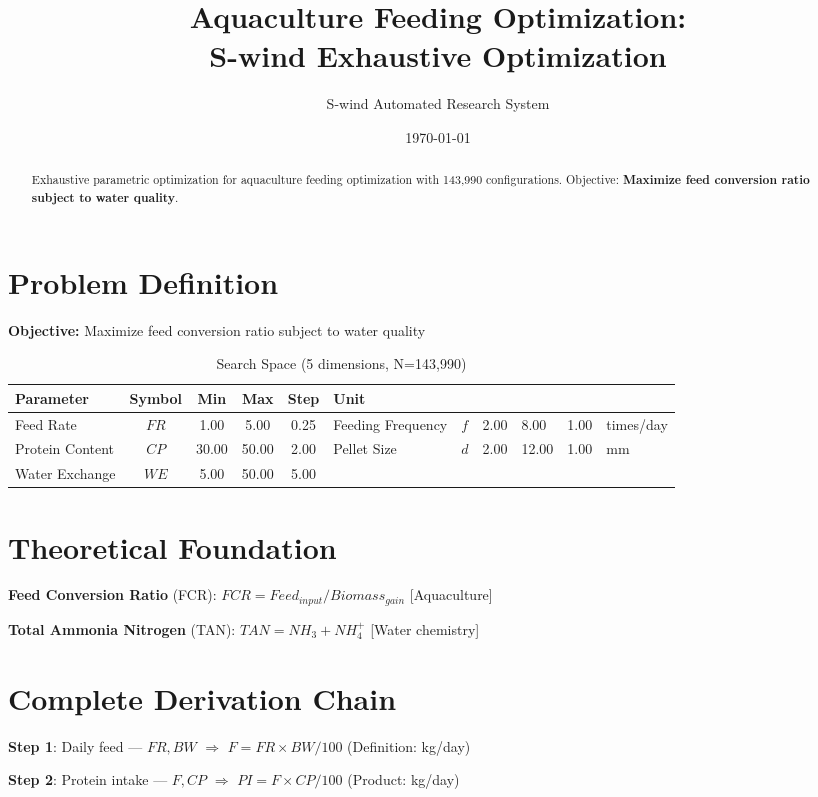 \documentclass[11pt,twocolumn]{article}
\title{Aquaculture Feeding Optimization: \\S-wind Exhaustive Optimization}
\author{S-wind Automated Research System}
\date{\today}
\begin{document}
\maketitle

\begin{abstract}
Exhaustive parametric optimization for aquaculture feeding optimization with 143,990 configurations.
Objective: \textbf{Maximize feed conversion ratio subject to water quality}.
\end{abstract}

\section{Problem Definition}
\textbf{Objective:} Maximize feed conversion ratio subject to water quality

\begin{table}[h]
\centering
\caption{Search Space (5 dimensions, N=143,990)}
\begin{tabular}{@{}lccccl@{}}
\toprule
Parameter & Symbol & Min & Max & Step & Unit \\
\midrule
Feed Rate & $FR$ & 1.00 & 5.00 & 0.25 & %
Feeding Frequency & $f$ & 2.00 & 8.00 & 1.00 & times/day \\
Protein Content & $CP$ & 30.00 & 50.00 & 2.00 & %
Pellet Size & $d$ & 2.00 & 12.00 & 1.00 & mm \\
Water Exchange & $WE$ & 5.00 & 50.00 & 5.00 & %
\bottomrule
\end{tabular}
\end{table}

\section{Theoretical Foundation}
\textbf{Feed Conversion Ratio} (FCR): $FCR = Feed_{input}/Biomass_{gain}$ [Aquaculture]

\textbf{Total Ammonia Nitrogen} (TAN): $TAN = NH_3 + NH_4^+$ [Water chemistry]


\section{Complete Derivation Chain}
\textbf{Step 1}: Daily feed --- $FR, BW$ $\Rightarrow$ $F = FR \times BW / 100$ (Definition: kg/day)


\textbf{Step 2}: Protein intake --- $F, CP$ $\Rightarrow$ $PI = F \times CP/100$ (Product: kg/day)
\end{document}
